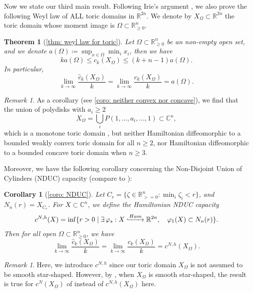 \documentclass[11pt]{amsart}
\numberwithin{equation}{section}
\theoremstyle{plain}
\newtheorem{Thm}{Theorem}[section]
\newtheorem{Coro}[coro]{Corollary}
\theoremstyle{definition}
\theoremstyle{remark}
\newtheorem{RMK}[rmk]{Remark}
\newcommand{\bC} { {\mathbb{C}}}
\newcommand{\bR} { {\mathbb{R}}}
\begin{document}
Now we state our third main result. Following Irie's argument \cite{Irie_ChainModel}, we also prove the following Weyl law of ALL toric domains in $\bR^{2n}$. We denote by $X_\Omega \subset \bR^{2n}$ the toric domain whose moment image is $\Omega \subset \bR^n_{\geq 0}$.
\begin{Thm}[{\autoref{thm: weyl law for toric}}]Let $\Omega\subset \mathbb R_{\geq 0}^n$ be an non-empty open set, and we denote $a(\Omega)\coloneqq \sup_{x\in {\Omega}}\min_i x_i $, then we have
\[ ka(\Omega)\leq c_k(X_\Omega) \leq (k+n-1)a(\Omega). \]
In particular, 
\[\lim_{k\to \infty}\frac{\widehat{c}_k(X_\Omega)}{k}=\lim_{k\to \infty}\frac{{c}_k(X_\Omega)}{k} = a(\Omega).\]
\end{Thm}

\begin{RMK}As a corollary (see \autoref{coro: neither convex nor concave}), we find that the union of polydisks with $a_i\geq 2$
\[X_\Omega=\bigcup_i P(1,\dots,a_i,\dots,1) \subset \bC^n,\]
which is a monotone toric domain \cite{GuttHutchingsRamos}, but neither Hamiltonian diffeomorphic to a bounded weakly convex toric domain for all $n\geq 2$, nor Hamiltonian diffeomorphic to a bounded concave toric domain when $n\geq 3$.
\end{RMK}

Moreover, we have the following corollary concerning the Non-Disjoint Union of Cylinders (NDUC) capacity (compare to \cite[Definition 4]{GPR22}):
\begin{Coro}[{\autoref{coro: NDUC}}]Let $C_r=\{\zeta \in \bR^n_{>=0} : \min_i \zeta_i < r\}$, and $N_n(r)=X_{C_r}$. For $X\subset \bC^{n}$, we define the \textit{Hamiltonian NDUC capacity}
\[c^{N,h}(X)=\inf\{r>0\mid \exists\,\varphi_s:X \lhook\joinrel\xrightarrow{Ham} \bR^{2n}, \quad \varphi_1(X)\subset N_n(r)\}.\]
Then for all open $\Omega\subset \bR^n_{\geq 0}$, we have
\[\lim_{k\to \infty}\frac{\widehat{c}_k(X_\Omega)}{k}=\lim_{k\to \infty}\frac{{c}_k(X_\Omega)}{k}=c^{N,h}(X_\Omega).\]    
\end{Coro}
\begin{RMK}Here, we introduce $c^{N,h}$ since our toric domain $X_\Omega$ is not assumed to be smooth star-shaped. However, by \cite[Principle 4.3]{Sch18}, when $X_\Omega$ is smooth star-shaped, the result is true for  $c^{N}(X_\Omega)$ of \cite[Definition 4]{GPR22} instead of  $c^{N,h}(X_\Omega)$ here.
\end{RMK}
\end{document}
